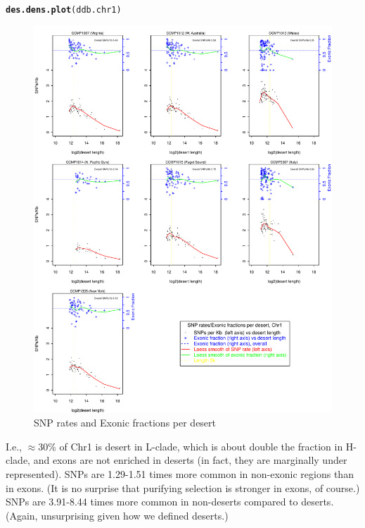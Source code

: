 \documentclass{article}\usepackage[]{graphicx}\usepackage[]{color}
\makeatletter
\def\maxwidth{ %
  \ifdim\Gin@nat@width>\linewidth
    \linewidth
  \else
    \Gin@nat@width
  \fi
}
\newcommand{\hlstd}[1]{\textcolor[rgb]{0.345,0.345,0.345}{#1}}%
\newcommand{\hlkwd}[1]{\textcolor[rgb]{0.737,0.353,0.396}{\textbf{#1}}}%
\newenvironment{kframe}{%
 \def\at@end@of@kframe{}%
 \ifinner\ifhmode%
  \def\at@end@of@kframe{\end{minipage}}%
  \begin{minipage}{\columnwidth}%
 \fi\fi%
 \def\FrameCommand##1{\hskip\@totalleftmargin \hskip-\fboxsep
 \colorbox{shadecolor}{##1}\hskip-\fboxsep
     \hskip-\linewidth \hskip-\@totalleftmargin \hskip\columnwidth}%
 \MakeFramed {\advance\hsize-\width
   \@totalleftmargin\z@ \linewidth\hsize
   \@setminipage}}%
 {\par\unskip\endMakeFramed%
 \at@end@of@kframe}
\newenvironment{knitrout}{}{} %
\makeatother
\begin{document}
\begin{knitrout}\footnotesize
{}\color{fgcolor}\begin{kframe}
\begin{alltt}
\hlkwd{des.dens.plot}\hlstd{(ddb.chr1)}
\end{alltt}
\end{kframe}\begin{figure}
\includegraphics[width=\maxwidth]{figs-knitr/snp-ex-vs-deslen-1} \caption[SNP rates and Exonic fractions per desert]{SNP rates and Exonic fractions per desert}\label{fig:snp-ex-vs-deslen}
\end{figure}


\end{knitrout}

I.e., $\approx$30\% of Chr1 is desert in L-clade, which is about double the fraction in H-clade, and exons are not enriched in
deserts (in fact, they are marginally under represented).  SNPs are 1.29-1.51 times more common in non-exonic regions
than in exons.  (It is no surprise that purifying selection is stronger in exons, of course.)  SNPs are 3.91-8.44 times
more common in non-deserts compared to deserts.  (Again, unsurprising given how we defined deserts.)
\end{document}
